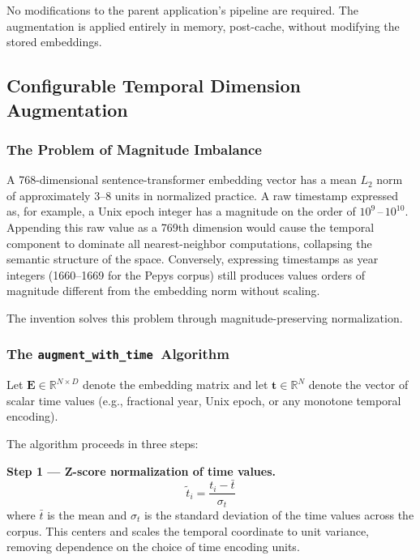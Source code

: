 \documentclass[12pt,letterpaper]{article}
\newcommand{\augtime}{\texttt{augment\_with\_time}}
\begin{document}
No modifications to the parent application's pipeline are required. The
augmentation is applied entirely in memory, post-cache, without modifying the
stored embeddings.

\subsection{Configurable Temporal Dimension Augmentation}
\label{sec:augment}

\subsubsection{The Problem of Magnitude Imbalance}

A 768-dimensional sentence-transformer embedding vector has a mean $L_2$ norm
of approximately 3--8 units in normalized practice. A raw timestamp expressed
as, for example, a Unix epoch integer has a magnitude on the order of
$10^9$\,--\,$10^{10}$. Appending this raw value as a 769th dimension would
cause the temporal component to dominate all nearest-neighbor computations,
collapsing the semantic structure of the space. Conversely, expressing
timestamps as year integers (1660--1669 for the Pepys corpus) still produces
values orders of magnitude different from the embedding norm without scaling.

The invention solves this problem through magnitude-preserving normalization.

\subsubsection{The \augtime\ Algorithm}

Let $\mathbf{E} \in \mathbb{R}^{N \times D}$ denote the embedding matrix and
let $\mathbf{t} \in \mathbb{R}^N$ denote the vector of scalar time values
(e.g., fractional year, Unix epoch, or any monotone temporal encoding).

The algorithm proceeds in three steps:

\textbf{Step 1 --- Z-score normalization of time values.}
\begin{equation}
  \tilde{t}_i = \frac{t_i - \bar{t}}{\sigma_t}
  \label{eq:zscore}
\end{equation}
where $\bar{t}$ is the mean and $\sigma_t$ is the standard deviation of the
time values across the corpus. This centers and scales the temporal coordinate
to unit variance, removing dependence on the choice of time encoding units.
\end{document}
